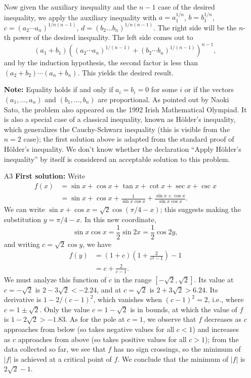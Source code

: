\documentclass[amssymb,twocolumn,pra,10pt,aps]{revtex4-1}
\begin{document}
\begin{itemize}
Now given the auxiliary inequality and the $n-1$ case of the desired
inequality, we apply the auxiliary inequality with $a = a_1^{1/n}$,
$b = b_1^{1/n}$, $c = (a_2 \cdots a_n)^{1/n(n-1)}$,
$d = (b_2 \dots b_n)^{1/n(n-1)}$. The right side will be the $n$-th
power of the desired inequality. The left side comes out to
\[
(a_1 + b_1)((a_2 \cdots a_n)^{1/(n-1)} + (b_2 \cdots b_n)^{1/(n-1)})^{n-1},
\]
and by the induction hypothesis, the second factor is less than
$(a_2 + b_2)\cdots(a_n+b_n)$. This yields the desired result.

\textbf{Note:}
Equality holds if and only if $a_i=b_i=0$ for some $i$ or if the vectors
$(a_1, \dots, a_n)$ and $(b_1, \dots, b_n)$ are proportional.
As pointed out by Naoki Sato, the problem also appeared on the 1992
Irish Mathematical Olympiad.
It is also a special case of a classical inequality,
known as H\"older's inequality, which generalizes the
Cauchy-Schwarz inequality (this is visible from the $n=2$ case); the
first solution above is adapted from the standard proof of H\"older's
inequality.
We don't know whether the declaration
``Apply H\"older's inequality'' by itself is considered
an acceptable solution to this problem.

\item[A3]
\textbf{First solution:}
Write
\begin{align*}
f(x) &= \sin x + \cos x + \tan x + \cot x + \sec x + \csc x \\
&= \sin x + \cos x + \frac{1}{\sin x \cos x} + \frac{\sin x + \cos x}{\sin x
\cos x}.
\end{align*}
We can write $\sin x + \cos x = \sqrt{2} \cos(\pi/4 - x)$; this suggests
making the substitution $y = \pi/4 - x$. In this new coordinate,
\[
\sin x \cos x = \frac{1}{2} \sin 2x = \frac{1}{2} \cos 2y,
\]
and writing $c = \sqrt{2} \cos y$, we have
\begin{align*}
f(y) &= (1 + c)\left(1 + \frac{2}{c^2 -1} \right) - 1 \\
&= c + \frac{2}{c - 1}.
\end{align*}
We must analyze this function of $c$ in the range $[-\sqrt{2}, \sqrt{2}]$.
Its value at $c=-\sqrt{2}$ is $2 - 3\sqrt{2} < -2.24$, and at
$c = \sqrt{2}$ is $2 + 3\sqrt{2}>6.24$.
Its derivative is $1 - 2/(c-1)^2$, which vanishes when
$(c-1)^2 = 2$, i.e., where $c = 1 \pm \sqrt{2}$. Only the value
$c = 1 - \sqrt{2}$ is in bounds, at which
the value of $f$ is $1-2\sqrt{2} > -1.83$. As for the pole at $c=1$,
we observe that $f$ decreases as $c$ approaches from below
(so takes negative values for all $c<1$) and increases as $c$
approaches from above (so takes positive values for all $c>1$); from
the data collected so far, we see that $f$ has no sign crossings, so
the minimum of $|f|$ is achieved at a critical point of $f$.
We conclude that the minimum of $|f|$ is $2 \sqrt{2} - 1$.


\end{itemize}
\end{document}
